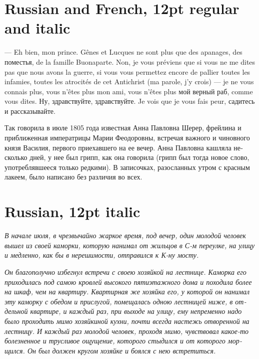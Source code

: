 \documentclass[12pt]{book}
\newcommand{\cyrillicfont}{\stdfont}
\newcommand{\russ}[1]{\textrussian{\cyrillicfont#1}}
\begin{document}
\section*{Russian and French, 12pt regular and italic}

\noindent\textfrench{— Eh bien, mon prince. Gênes et Lucques ne sont plus que des apanages,
des поместья, de la famille Buonaparte. Non, je vous préviens que si
vous ne me dites pas que nous avons la guerre, si vous vous permettez
encore de pallier toutes les infamies, toutes les atrocités de cet
Antichrist (ma parole, j'y crois) — je ne vous connais plus, vous
n'êtes plus mon ami, vous n'êtes plus} \russ{мой верный раб, comme vous
dites. Ну, здравствуйте, здравствуйте. Je vois que je vous fais
peur, садитесь и рассказывайте.}

\russ{Так говорила в июле 1805 года известная Анна Павловна Шерер, фрейлина
и приближенная императрицы Марии Феодоровны, встречая важного и
чиновного князя Василия, первого приехавшего на ее вечер. Анна
Павловна кашляла несколько дней, у нее был грипп, как она говорила
(грипп был тогда новое слово, употреблявшееся только редкими). В
записочках, разосланных утром с красным лакеем, было написано без
различия во всех.}

\section*{Russian, 12pt italic}

\russ{\itshape В начале июля, в чрезвычайно жаркое время, под вечер, один молодой
человек вышел из своей каморки, которую нанимал от жильцов в С-м
переулке, на улицу и медленно, как бы в нерешимости, отправился к К-ну
мосту.}

\russ{\itshape Он благополучно избегнул встречи с своею хозяйкой на лестнице. Каморка
его приходилась под самою кровлей высокого пятиэтажного дома и
походила более на шкаф, чем на квартиру. Квартирная же хозяйка его, у
которой он нанимал эту каморку с обедом и прислугой, помещалась одною
лестницей ниже, в отдельной квартире, и каждый раз, при выходе на
улицу, ему непременно надо было проходить мимо хозяйкиной кухни, почти
всегда настежь отворенной на лестницу. И каждый раз молодой человек,
проходя мимо, чувствовал какое-то болезненное и трусливое ощущение,
которого стыдился и от которого морщился. Он был должен кругом хозяйке
и боялся с нею встретиться.}
\end{document}
